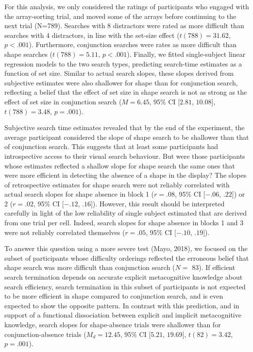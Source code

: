 \documentclass[12pt,twoside]{reedthesis}
\begin{document}
For this analysis, we only considered the ratings of participants who engaged with the array-sorting trial, and moved some of the arrays before continuing to the next trial (N=789). Searches with 8 distractors were rated as more difficult than searches with 4 distractors, in line with the set-size effect (\(t(788) = 31.62\), \(p < .001\)). Furthermore, conjunction searches were rates as more difficult than shape searches (\(t(788) = 5.11\), \(p < .001\)). Finally, we fitted single-subject linear regression models to the two search types, predicting search-time estimates as a function of set size. Similar to actual search slopes, these slopes derived from subjective estimates were also shallower for shape than for conjunction search, reflecting a belief that the effect of set size in shape search is not as strong as the effect of set size in conjunction search (\(M = 6.45\), 95\% CI \([2.81\), \(10.08]\), \(t(788) = 3.48\), \(p = .001\)).

Subjective search time estimates revealed that by the end of the experiment, the average participant considered the slope of shape search to be shallower than that of conjunction search. This suggests that at least some participants had introspective access to their visual search behaviour. But were those participants whose estimates reflected a shallow slope for shape search the same ones that were more efficient in detecting the absence of a shape in the display? The slopes of retrospective estimates for shape search were not reliably correlated with actual search slopes for shape absence in block 1 (\(r = .08\), 95\% CI \([-.06\), \(.22]\)) or 2 (\(r = .02\), 95\% CI \([-.12\), \(.16]\)). However, this result should be interpreted carefully in light of the low reliability of single subject estimated that are derived from one trial per cell. Indeed, search slopes for shape absence in blocks 1 and 3 were not reliably correlated themselves (\(r = .05\), 95\% CI \([-.10\), \(.19]\)).

To answer this question using a more severe test (Mayo, 2018), we focused on the subset of participants whose difficulty orderings reflected the erroneous belief that shape search was more difficult than conjunction search (\(N=\) 83). If efficient search termination depends on accurate explicit metacognitive knowledge about search efficiency, search termination in this subset of participants is not expected to be more efficient in shape compared to conjunction search, and is even expected to show the opposite pattern. In contrast with this prediction, and in support of a functional dissociation between explicit and implicit metacognitive knowledge, search slopes for shape-absence trials were shallower than for conjunction-absence trials (\(M_d = 12.45\), 95\% CI \([5.21\), \(19.69]\), \(t(82) = 3.42\), \(p = .001\)).
\end{document}
